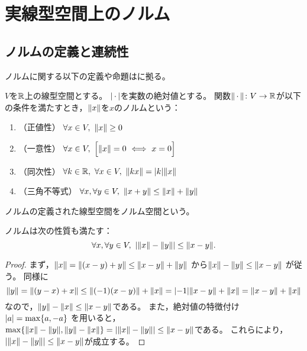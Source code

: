 \documentclass[b5paper,draft]{ltjsbook}
\begin{document}
\ifdraft{\tableofcontents}{}
\section{実線型空間上のノルム}

\subsection{ノルムの定義と連続性}
ノルムに関する以下の定義や命題は\cite{nomura}に拠る。

\begin{defi}[ノルム]
    $V$を$\mathbb{R}$上の線型空間とする。
    $\abs{\dummy}$を実数の絶対値とする。
    関数$\norm{\dummy}\colon V\to \R$が以下の条件を満たすとき，$\norm{x}$を$x$のノルムという：
    \begin{enumerate}[label=(\roman*)]
        \item （正値性） $\forall x\in V,\ \norm{x}\geq 0$
        \item （一意性） $\forall x\in V,\ \bsqu{\norm{x}=0\ \Longleftrightarrow\ x=0}$
        \item （同次性） $\forall k\in \R,\ \forall x\in V,\ \norm{kx}=\abs{k}\norm{x}$
        \item （三角不等式） $\forall x, \forall y\in V,\ \norm{x+y}\leq \norm{x}+\norm{y}$
    \end{enumerate}
\end{defi}

ノルムの定義された線型空間をノルム空間という。


\begin{prop}[三角不等式]
    ノルムは次の性質も満たす：
    \begin{equation}
        \forall x, \forall y\in V,\ \abs{\norm{x}-\norm{y}}\leq \norm{x-y}.
    \end{equation}
    \begin{proof}
        まず，$\norm{x}=\norm{\pare{x-y}+y}\leq \norm{x-y}+\norm{y}$
        から$\norm{x}-\norm{y}\leq \norm{x-y}$
        が従う。
        同様に
        \begin{equation}
            \norm{y}=\norm{\pare{y-x}+x}\leq \norm{\pare{-1}\pare{x-y}}+\norm{x}=\abs{-1}\norm{x-y}+\norm{x}=\norm{x-y}+\norm{x}
        \end{equation}
        なので，$\norm{y}-\norm{x}\leq \norm{x-y}$である。
        また，絶対値の特徴付け$\abs{a}= \max\bra{a,-a}$
        を用いると，$ \max\bra{\norm{x}-\norm{y},\norm{y}-\norm{x}} = \abs{\norm{x}-\norm{y}}\leq \norm{x-y}$である。
        これらにより，$\abs{\norm{x}-\norm{y}}\leq \norm{x-y}$が成立する。
    \end{proof}
\end{prop}
\end{document}
